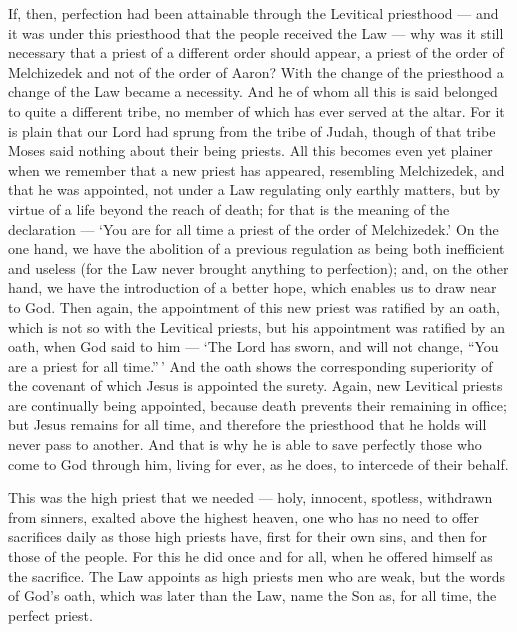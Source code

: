  If, then, perfection had been attainable through the
Levitical priesthood --- and it was under this priesthood that the
people received the Law --- why was it still necessary that a priest of
a different order should appear, a priest of the order of Melchizedek
and not of the order of Aaron?  With the change of the
priesthood a change of the Law became a necessity.  And he
of whom all this is said belonged to quite a different tribe, no member
of which has ever served at the altar.  For it is plain
that our Lord had sprung from the tribe of Judah, though of that tribe
Moses said nothing about their being priests.  All this
becomes even yet plainer when we remember that a new priest has
appeared, resembling Melchizedek,  and that he was
appointed, not under a Law regulating only earthly matters, but by
virtue of a life beyond the reach of death;  for that is
the meaning of the declaration --- `You are for all time a priest of the
order of Melchizedek.'  On the one hand, we have the
abolition of a previous regulation as being both inefficient and useless
 (for the Law never brought anything to perfection); and,
on the other hand, we have the introduction of a better hope, which
enables us to draw near to God.  Then again, the
appointment of this new priest was ratified by an oath, which is not so
with the Levitical priests,  but his appointment was
ratified by an oath, when God said to him --- `The Lord has sworn, and
will not change, ``You are a priest for all time.''\,'  And
the oath shows the corresponding superiority of the covenant of which
Jesus is appointed the surety.  Again, new Levitical
priests are continually being appointed, because death prevents their
remaining in office;  but Jesus remains for all time, and
therefore the priesthood that he holds will never pass to another.
 And that is why he is able to save perfectly those who
come to God through him, living for ever, as he does, to intercede of
their behalf.

 This was the high priest that we needed --- holy,
innocent, spotless, withdrawn from sinners, exalted above the highest
heaven,  one who has no need to offer sacrifices daily as
those high priests have, first for their own sins, and then for those of
the people. For this he did once and for all, when he offered himself as
the sacrifice.  The Law appoints as high priests men who
are weak, but the words of God's oath, which was later than the Law,
name the Son as, for all time, the perfect priest.

